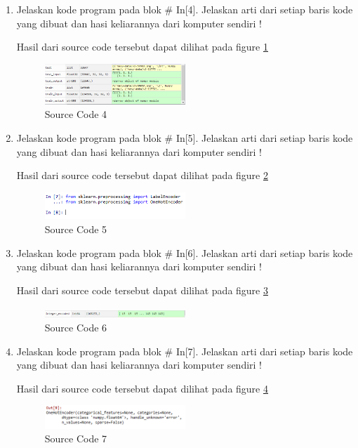 \begin{enumerate}
\item Jelaskan kode program pada blok \# In[4]. Jelaskan arti dari setiap baris kode yang dibuat dan hasi keliarannya dari komputer sendiri !
	
	\subitem Hasil dari source code tersebut dapat dilihat pada figure \ref{YNC7-12}
	\begin{figure}[!htbp!]
		\centerline{\includegraphics[width=0.5\textwidth]{figures/YN/Chapter7/YNC7-12.png}}
		\caption{Source Code 4}
		\label{YNC7-12}
	\end{figure}	

\item Jelaskan kode program pada blok \# In[5]. Jelaskan arti dari setiap baris kode yang dibuat dan hasi keliarannya dari komputer sendiri !
	
	\subitem Hasil dari source code tersebut dapat dilihat pada figure \ref{YNC7-13}
	\begin{figure}[!htbp!]
		\centerline{\includegraphics[width=0.5\textwidth]{figures/YN/Chapter7/YNC7-13.png}}
		\caption{Source Code 5}
		\label{YNC7-13}
	\end{figure}	

\item Jelaskan kode program pada blok \# In[6]. Jelaskan arti dari setiap baris kode yang dibuat dan hasi keliarannya dari komputer sendiri !
	
	\subitem Hasil dari source code tersebut dapat dilihat pada figure \ref{YNC7-14}
	\begin{figure}[!htbp!]
		\centerline{\includegraphics[width=0.5\textwidth]{figures/YN/Chapter7/YNC7-14.png}}
		\caption{Source Code 6}
		\label{YNC7-14}
	\end{figure}	

\item Jelaskan kode program pada blok \# In[7]. Jelaskan arti dari setiap baris kode yang dibuat dan hasi keliarannya dari komputer sendiri !
	
	\subitem Hasil dari source code tersebut dapat dilihat pada figure \ref{YNC7-15}
	\begin{figure}[!htbp!]
		\centerline{\includegraphics[width=0.5\textwidth]{figures/YN/Chapter7/YNC7-15.png}}
		\caption{Source Code 7}
		\label{YNC7-15}
	\end{figure}	


\end{enumerate}
